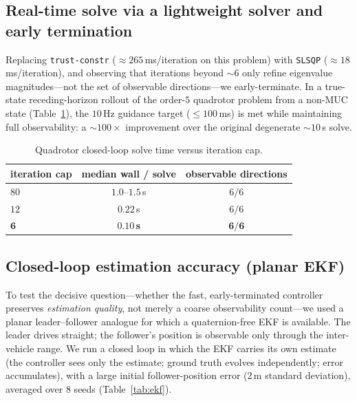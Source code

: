 \documentclass[11pt]{article}
\begin{document}
\subsection{Real-time solve via a lightweight solver and early termination}

Replacing \texttt{trust-constr} (${\approx}265$\,ms/iteration on this problem) with
\texttt{SLSQP} (${\approx}18$\,ms/iteration), and observing that iterations beyond ${\sim}6$
only refine eigenvalue magnitudes---not the set of observable directions---we early-terminate.
In a true-state receding-horizon rollout of the order-$5$ quadrotor problem from a non-MUC
state (Table~\ref{tab:realtime}), the $10$\,Hz guidance target ($\le 100$\,ms) is met while
maintaining full observability: a ${\sim}100\times$ improvement over the original degenerate
${\sim}10$\,s solve.

\begin{table}[h]
\centering
\caption{Quadrotor closed-loop solve time versus iteration cap.}
\label{tab:realtime}
\begin{tabular}{lcc}
\toprule
iteration cap & median wall / solve & observable directions \\
\midrule
$80$ & $1.0\text{--}1.5$\,s & $6/6$ \\
$12$ & $0.22$\,s & $6/6$ \\
$\mathbf{6}$ & $\mathbf{0.10}$\,\textbf{s} & $\mathbf{6/6}$ \\
\bottomrule
\end{tabular}
\end{table}

\subsection{Closed-loop estimation accuracy (planar EKF)}

To test the decisive question---whether the fast, early-terminated controller preserves
\emph{estimation quality}, not merely a coarse observability count---we used a planar
leader--follower analogue for which a quaternion-free EKF is available. The leader drives
straight; the follower's position is observable only through the inter-vehicle range. We run a
closed loop in which the EKF carries its own estimate (the controller sees only the estimate;
ground truth evolves independently; error accumulates), with a large initial follower-position
error ($2$\,m standard deviation), averaged over $8$ seeds (Table~\ref{tab:ekf}).
\end{document}
